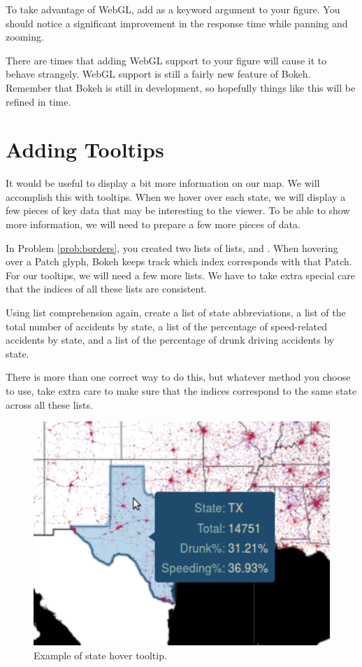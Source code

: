 \begin{problem} \label{prob:webgl}
To take advantage of WebGL, add  as a keyword argument to
your figure. You should notice a significant improvement in the response time
while panning and zooming.

\begin{info}
There are times that adding WebGL support to your figure will cause it to behave
strangely. WebGL support is still a fairly new feature of Bokeh. Remember
that Bokeh is still in development, so hopefully things like this will be refined
in time.
\end{info}
\end{problem}

\section*{Adding Tooltips}
It would be useful to display a bit more information on our map. We will
accomplish this with tooltips. When we hover over each state, we will display
a few pieces of key data that may be interesting to the viewer.
To be able to show more information, we will need to prepare a few more
pieces of data.

\begin{problem} \label{prob:lists}
In Problem \ref{prob:borders}, you created two lists of lists,  and
. When hovering over a Patch glyph, Bokeh keeps track which index
corresponds with that Patch. For our tooltips, we will need a few more lists. We
have to take extra special care that the indices of all these lists are
consistent.

Using list comprehension again, create a list of state abbreviations, a list of
the total number of accidents by state, a list of the percentage of speed-related
accidents by state, and a list of the percentage of drunk driving accidents by
state.

There is more than one correct way to do this, but whatever method you choose to
use, take extra care to make sure that the indices correspond to the same state
across all these lists.
\end{problem}

\begin{figure}
    \includegraphics[width=.5\linewidth]{BokehFigs/hover.pdf}
    \caption{Example of state hover tooltip.}
    \label{fig:hover}
\end{figure}

